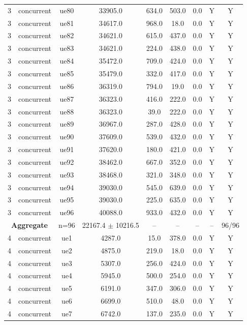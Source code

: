\begin{table}[ht]
\begin{tabular}{|c|c|c|c|c|c|c|c|c|}
3 & concurrent & ue80 & 33905.0 & 634.0 & 503.0 & 0.0 & Y & Y \\
3 & concurrent & ue81 & 34617.0 & 968.0 & 18.0 & 0.0 & Y & Y \\
3 & concurrent & ue82 & 34621.0 & 615.0 & 437.0 & 0.0 & Y & Y \\
3 & concurrent & ue83 & 34621.0 & 224.0 & 438.0 & 0.0 & Y & Y \\
3 & concurrent & ue84 & 35472.0 & 709.0 & 424.0 & 0.0 & Y & Y \\
3 & concurrent & ue85 & 35479.0 & 332.0 & 417.0 & 0.0 & Y & Y \\
3 & concurrent & ue86 & 36319.0 & 794.0 & 19.0 & 0.0 & Y & Y \\
3 & concurrent & ue87 & 36323.0 & 416.0 & 222.0 & 0.0 & Y & Y \\
3 & concurrent & ue88 & 36323.0 & 39.0 & 222.0 & 0.0 & Y & Y \\
3 & concurrent & ue89 & 36967.0 & 287.0 & 428.0 & 0.0 & Y & Y \\
3 & concurrent & ue90 & 37609.0 & 539.0 & 432.0 & 0.0 & Y & Y \\
3 & concurrent & ue91 & 37620.0 & 180.0 & 421.0 & 0.0 & Y & Y \\
3 & concurrent & ue92 & 38462.0 & 667.0 & 352.0 & 0.0 & Y & Y \\
3 & concurrent & ue93 & 38468.0 & 321.0 & 348.0 & 0.0 & Y & Y \\
3 & concurrent & ue94 & 39030.0 & 545.0 & 639.0 & 0.0 & Y & Y \\
3 & concurrent & ue95 & 39030.0 & 225.0 & 635.0 & 0.0 & Y & Y \\
3 & concurrent & ue96 & 40088.0 & 933.0 & 432.0 & 0.0 & Y & Y \\
\multicolumn{2}{|c|}{\textbf{Aggregate}} & n=96 & 22167.4 $\pm$ 10216.5 & -- & -- & -- & -- & 96/96 \\
\hline
4 & concurrent & ue1 & 4287.0 & 15.0 & 378.0 & 0.0 & Y & Y \\
4 & concurrent & ue2 & 4875.0 & 219.0 & 18.0 & 0.0 & Y & Y \\
4 & concurrent & ue3 & 5307.0 & 256.0 & 424.0 & 0.0 & Y & Y \\
4 & concurrent & ue4 & 5945.0 & 500.0 & 254.0 & 0.0 & Y & Y \\
4 & concurrent & ue5 & 6191.0 & 347.0 & 306.0 & 0.0 & Y & Y \\
4 & concurrent & ue6 & 6699.0 & 510.0 & 48.0 & 0.0 & Y & Y \\
4 & concurrent & ue7 & 6742.0 & 137.0 & 235.0 & 0.0 & Y & Y \\

\end{tabular}
\end{table}
